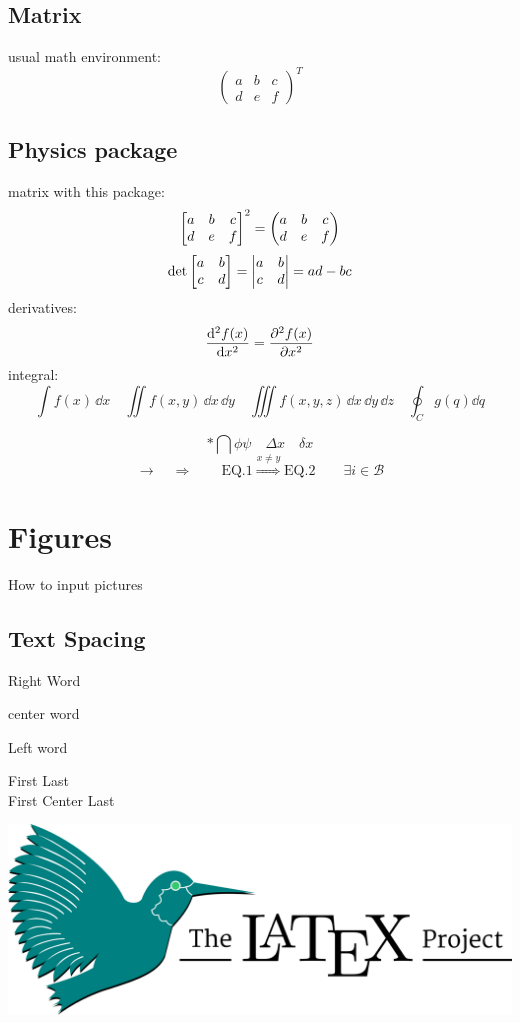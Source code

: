 \documentclass[12pt]{article}
\begin{document}
	\subsection{Matrix}
	usual math environment:
	\[ \begin{pmatrix}
		a & b & c \\ d & e & f
	\end{pmatrix}^T \]
	\subsection{Physics package}
	matrix with this package:
	\[ \mqty[a & b & c \\ d & e & f]^2 = \mqty(a & b & c \\ d & e & f)\]
	\[ \det \mqty[a & b  \\ c & d] = \mqty|a & b  \\ c & d| = ad-bc\]
	derivatives:
	\[ \dv[2]{f(x)}{x} = \pdv[2]{f(x)}{x} \]
	integral:
	\[ \int f(x) \, \dd x \quad  \iint f(x,y) \, \dd x \, \dd y \quad \iiint f(x,y,z) \, \dd x \, \dd y \, \dd z \quad \oint_C g(q) \dd q\]
	
	\[
	\ast \bigcap \phi \psi \quad \Delta x \quad \delta x
	\]
	\[
	\rightarrow \quad \Rightarrow \qquad \text{EQ.1} \stackrel{x\neq y}{\Longrightarrow} \text{EQ.2} \qquad \exists i \in \mathcal{B}
	\]
	
	\section{Figures}
	How to input pictures
	\subsection{Text Spacing}
	\begin{flushright}
		Right Word
	\end{flushright}
	\begin{center}
		center word
	\end{center}
	\begin{flushleft}
		Left word
	\end{flushleft}
	First \hfill Last \\
		First \hfill Center \hfill Last \\
	\begin{center}
		\includegraphics[width=0.5\linewidth]{pic1.png}
	\end{center}
	\pagebreak
\end{document}
